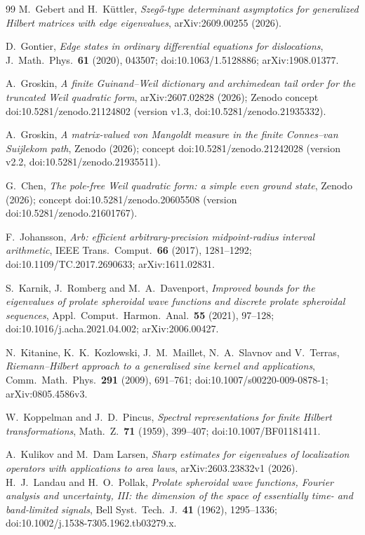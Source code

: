 \begin{thebibliography}{99}
 M.~Gebert and H.~K\"uttler,
\emph{Szeg\H{o}-type determinant asymptotics for generalized Hilbert matrices
with edge eigenvalues}, arXiv:2609.00255 (2026).

 D.~Gontier,
\emph{Edge states in ordinary differential equations for dislocations},
J.\ Math.\ Phys.\ \textbf{61} (2020), 043507;
doi:10.1063/1.5128886; arXiv:1908.01377.

 A.~Groskin, \emph{A finite Guinand--Weil dictionary and
archimedean tail order for the truncated Weil quadratic form}, arXiv:2607.02828
(2026); Zenodo concept doi:10.5281/zenodo.21124802 (version v1.3,
doi:10.5281/zenodo.21935332).

 A.~Groskin, \emph{A matrix-valued von Mangoldt
measure in the finite Connes--van Suijlekom path}, Zenodo (2026); concept
doi:10.5281/zenodo.21242028 (version v2.2,
doi:10.5281/zenodo.21935511).

 G.~Chen, \emph{The pole-free Weil quadratic form: a
simple even ground state}, Zenodo (2026); concept
doi:10.5281/zenodo.20605508 (version doi:10.5281/zenodo.21601767).

 F.~Johansson,
\emph{Arb: efficient arbitrary-precision midpoint-radius interval arithmetic},
IEEE Trans.\ Comput.\ \textbf{66} (2017), 1281--1292;
doi:10.1109/TC.2017.2690633; arXiv:1611.02831.

 S.~Karnik, J.~Romberg and M.~A.~Davenport,
\emph{Improved bounds for the eigenvalues of prolate spheroidal wave functions
and discrete prolate spheroidal sequences}, Appl.\ Comput.\ Harmon.\ Anal.\ \textbf{55}
(2021), 97--128; doi:10.1016/j.acha.2021.04.002; arXiv:2006.00427.

N.~Kitanine, K.~K.~Kozlowski, J.~M.~Maillet, N.~A.~Slavnov and V.~Terras,
\emph{Riemann--Hilbert approach to a generalised sine kernel and applications},
Comm.\ Math.\ Phys.\ \textbf{291} (2009), 691--761;
doi:10.1007/s00220-009-0878-1; arXiv:0805.4586v3.

 W.~Koppelman and J.~D.~Pincus,
\emph{Spectral representations for finite Hilbert transformations},
Math.\ Z.\ \textbf{71} (1959), 399--407; doi:10.1007/BF01181411.

 A.~Kulikov and M.~Dam Larsen,
\emph{Sharp estimates for eigenvalues of localization operators with
applications to area laws}, arXiv:2603.23832v1 (2026).
 H.~J.~Landau and H.~O.~Pollak, \emph{Prolate
spheroidal wave functions, Fourier analysis and uncertainty, III: the dimension
of the space of essentially time- and band-limited signals}, Bell Syst.\ Tech.\
J.\ \textbf{41} (1962), 1295--1336; doi:10.1002/j.1538-7305.1962.tb03279.x.


\end{thebibliography}
